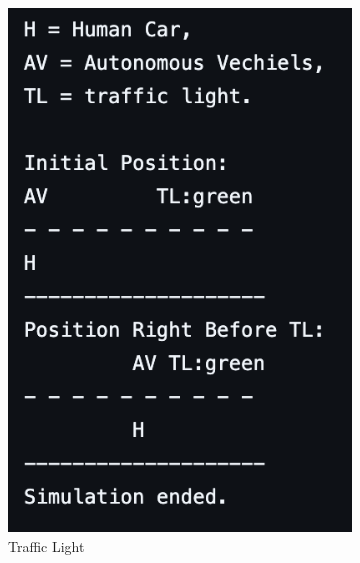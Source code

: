 \documentclass[conference]{IEEEtran}
\begin{document}
\begin{figure}[h]
\begin{subfigure}[b]{0.3\textwidth}
        \includegraphics[width=.9\linewidth]{Fig/Commonsense_S2.png}
        \caption{Traffic Light}
    \end{subfigure}
    \hfill
    \begin{subfigure}[b]{0.3\textwidth}

\end{subfigure}
\end{figure}
\end{document}
